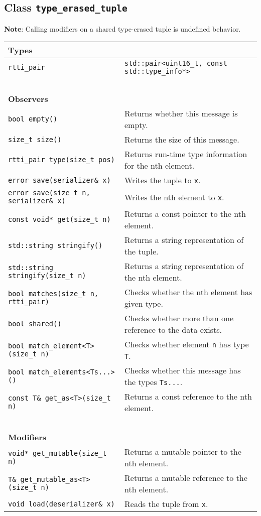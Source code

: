 \clearpage
\subsection{Class \lstinline^type_erased_tuple^}

\textbf{Note}: Calling modifiers on a shared type-erased tuple is undefined
behavior.

\begin{center}
\begin{tabular}{ll}
  \textbf{Types} & ~ \\
  \hline
  \lstinline^rtti_pair^ & \lstinline^std::pair<uint16_t, const std::type_info*>^ \\
  \hline
  ~ & ~ \\ \textbf{Observers} & ~ \\
  \hline
  \lstinline^bool empty()^ & Returns whether this message is empty. \\
  \hline
  \lstinline^size_t size()^ & Returns the size of this message. \\
  \hline
  \lstinline^rtti_pair type(size_t pos)^ & Returns run-time type information for the nth element. \\
  \hline
  \lstinline^error save(serializer& x)^ & Writes the tuple to \lstinline^x^. \\
  \hline
  \lstinline^error save(size_t n, serializer& x)^ & Writes the nth element to \lstinline^x^. \\
  \hline
  \lstinline^const void* get(size_t n)^ & Returns a const pointer to the nth element. \\
  \hline
  \lstinline^std::string stringify()^ & Returns a string representation of the tuple. \\
  \hline
  \lstinline^std::string stringify(size_t n)^ & Returns a string representation of the nth element. \\
  \hline
  \lstinline^bool matches(size_t n, rtti_pair)^ & Checks whether the nth element has given type. \\
  \hline
  \lstinline^bool shared()^ & Checks whether more than one reference to the data exists. \\
  \hline
  \lstinline^bool match_element<T>(size_t n)^ & Checks whether element \lstinline^n^ has type \lstinline^T^. \\
  \hline
  \lstinline^bool match_elements<Ts...>()^ & Checks whether this message has the types \lstinline^Ts...^. \\
  \hline
  \lstinline^const T& get_as<T>(size_t n)^ & Returns a const reference to the nth element. \\
  \hline
  ~ & ~ \\ \textbf{Modifiers} & ~ \\
  \hline
  \lstinline^void* get_mutable(size_t n)^ & Returns a mutable pointer to the nth element. \\
  \hline
  \lstinline^T& get_mutable_as<T>(size_t n)^ & Returns a mutable reference to the nth element. \\
  \hline
  \lstinline^void load(deserializer& x)^ & Reads the tuple from \lstinline^x^. \\
  \hline
\end{tabular}
\end{center}


